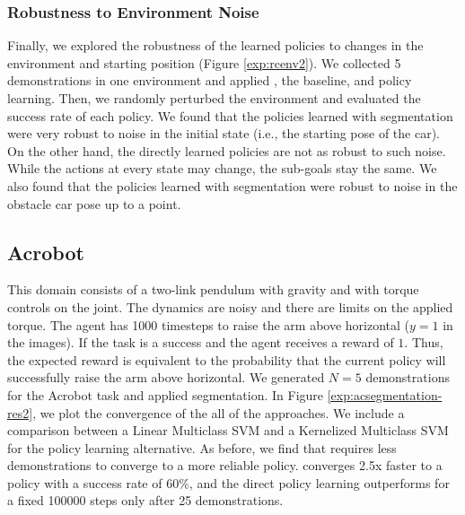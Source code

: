 \subsubsection{Robustness to Environment Noise}\label{exp:pper} Finally, we explored the robustness of the learned policies to changes in the environment and starting position (Figure \ref{exp:rcenv2}).
We collected 5 demonstrations in one environment and applied \hirl, the baseline, and policy learning.
Then, we randomly perturbed the environment and evaluated the success rate of each policy.
We found that the policies learned with segmentation were very robust to noise in the initial state (i.e., the starting pose of the car).
On the other hand, the directly learned policies are not as robust to such noise.
While the actions at every state may change, the sub-goals stay the same.
We also found that the policies learned with segmentation were robust to noise in the obstacle car pose up to a point.

\subsection{Acrobot}\label{exp:acrobot}
This domain consists of a two-link pendulum with gravity and with torque controls on the joint. The dynamics are noisy and there are limits on the applied torque. The agent has 1000 timesteps to raise the arm above horizontal ($y=1$ in the images). If the task is a success and the agent receives a reward of $1$. 
Thus, the expected reward is equivalent to the probability that the current policy will successfully raise the arm above horizontal.
We generated $N=5$ demonstrations for the Acrobot task and applied segmentation. 
In Figure \ref{exp:acsegmentation-res2}, we plot the convergence of the all of the approaches.
We include a comparison between a Linear Multiclass SVM and a Kernelized Multiclass SVM for the policy learning alternative.
As before, we find that \hirl requires less demonstrations to converge to a more reliable policy.
\hirl converges 2.5x faster to a policy with a success rate of 60\%, and the direct policy learning outperforms \hirl for a fixed 100000 steps only after 25 demonstrations.

